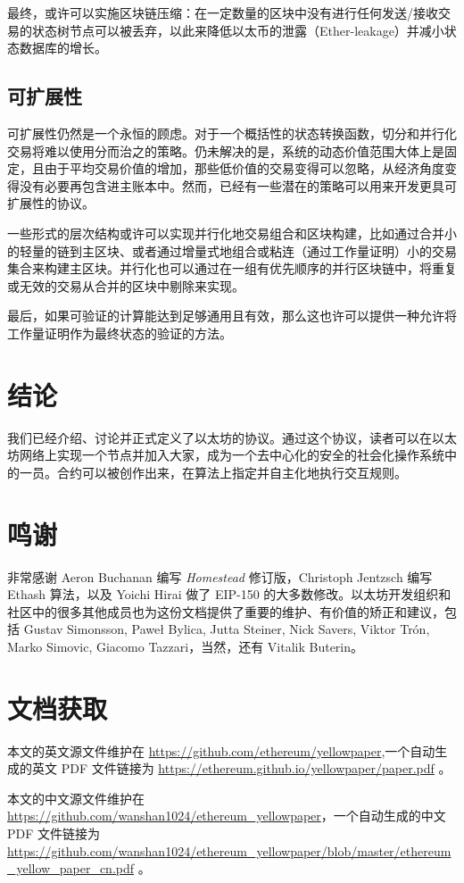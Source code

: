 \documentclass[9pt,oneside]{amsart}
\begin{document}
\begin{multicols}{2}
最终，或许可以实施区块链压缩：在一定数量的区块中没有进行任何发送/接收交易的状态树节点可以被丢弃，以此来降低以太币的泄露（Ether-leakage）并减小状态数据库的增长。

\subsection{可扩展性}

可扩展性仍然是一个永恒的顾虑。对于一个概括性的状态转换函数，切分和并行化交易将难以使用分而治之的策略。仍未解决的是，系统的动态价值范围大体上是固定，且由于平均交易价值的增加，那些低价值的交易变得可以忽略，从经济角度变得没有必要再包含进主账本中。然而，已经有一些潜在的策略可以用来开发更具可扩展性的协议。

一些形式的层次结构或许可以实现并行化地交易组合和区块构建，比如通过合并小的轻量的链到主区块、或者通过增量式地组合或粘连（通过工作量证明）小的交易集合来构建主区块。并行化也可以通过在一组有优先顺序的并行区块链中，将重复或无效的交易从合并的区块中剔除来实现。

最后，如果可验证的计算能达到足够通用且有效，那么这也许可以提供一种允许将工作量证明作为最终状态的验证的方法。

\section{结论} \label{ch:conclusion}

我们已经介绍、讨论并正式定义了以太坊的协议。通过这个协议，读者可以在以太坊网络上实现一个节点并加入大家，成为一个去中心化的安全的社会化操作系统中的一员。合约可以被创作出来，在算法上指定并自主化地执行交互规则。

\section{鸣谢}

非常感谢 Aeron Buchanan 编写 \textit{Homestead} 修订版，Christoph Jentzsch 编写 Ethash 算法，以及 Yoichi Hirai 做了 EIP-150 的大多数修改。以太坊开发组织和社区中的很多其他成员也为这份文档提供了重要的维护、有价值的矫正和建议，包括 Gustav Simonsson, Pawe\l{} Bylica, Jutta Steiner, Nick Savers, Viktor Tr\'{o}n, Marko Simovic, Giacomo Tazzari，当然，还有 Vitalik Buterin。

\section{文档获取}

本文的英文源文件维护在 \url{https://github.com/ethereum/yellowpaper},一个自动生成的英文 PDF 文件链接为 \url{https://ethereum.github.io/yellowpaper/paper.pdf} 。

本文的中文源文件维护在 \url{https://github.com/wanshan1024/ethereum_yellowpaper}，一个自动生成的中文 PDF 文件链接为 \url{https://github.com/wanshan1024/ethereum_yellowpaper/blob/master/ethereum_yellow_paper_cn.pdf} 。




\end{multicols}
\end{document}
